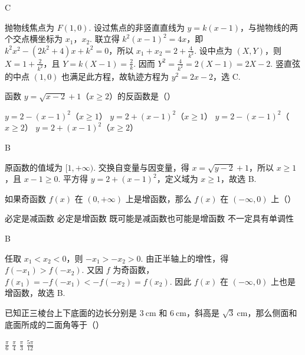 \documentclass[UTF8,a4paper,oneside,11pt]{ctexbook}
\begin{document}
\begin{answer}
C
\end{answer}

\begin{solution}
抛物线焦点为 \(F(1,0)\). 设过焦点的非竖直直线为 \(y=k(x-1)\)，与抛物线的两个交点横坐标为 \(x_1\)，\(x_2\). 联立得 \(k^2(x-1)^2=4x\)，即 \(k^2x^2-(2k^2+4)x+k^2=0\)，所以 \(x_1+x_2=2+\frac4{k^2}\). 设中点为 \((X,Y)\)，则 \(X=1+\frac2{k^2}\)，且 \(Y=k(X-1)=\frac2k\). 因而 \(Y^2=\frac4{k^2}=2(X-1)=2X-2\). 竖直弦的中点 \((1,0)\) 也满足此方程，故轨迹方程为 \(y^2=2x-2\)，选 C.
\end{solution}

\begin{problem}
函数 \(y = \sqrt{x - 2} + 1\)（\(x \geqslant 2\)）的反函数是（\quad）

\choices
    {\(y = 2 - (x - 1)^2\)（\(x \geqslant 1\)）}
    {\(y = 2 + (x - 1)^2\)（\(x \geqslant 1\)）}
    {\(y = 2 - (x - 1)^2\)（\(x \geqslant 2\)）}
    {\(y = 2 + (x - 1)^2\)（\(x \geqslant 2\)）}
\end{problem}

\begin{answer}
B
\end{answer}

\begin{solution}
原函数的值域为 \([1,+\infty)\). 交换自变量与因变量，得 \(x=\sqrt{y-2}+1\)，所以 \(x\geqslant1\)，且 \(x-1\geqslant0\). 平方得 \(y=2+(x-1)^2\)，定义域为 \(x\geqslant1\)，故选 B.
\end{solution}

\begin{problem}
如果奇函数 \(f(x)\) 在 \((0,+\infty)\) 上是增函数，那么 \(f(x)\) 在 \((-\infty,0)\) 上（\quad）

\choices
    {必定是减函数}
    {必定是增函数}
    {既可能是减函数也可能是增函数}
    {不一定具有单调性}
\end{problem}

\begin{answer}
B
\end{answer}

\begin{solution}
任取 \(x_1<x_2<0\)，则 \(-x_1>-x_2>0\). 由正半轴上的增性，得 \(f(-x_1)>f(-x_2)\). 又因 \(f\) 为奇函数，\(f(x_1)=-f(-x_1)<-f(-x_2)=f(x_2)\). 因此 \(f(x)\) 在 \((-\infty,0)\) 上也是增函数，故选 B.
\end{solution}

\begin{problem}
已知正三棱台上下底面的边长分别是 \(3\mathrm{~cm}\) 和 \(6\mathrm{~cm}\)，斜高是 \(\sqrt{3}\mathrm{~cm}\)，那么侧面和底面所成的二面角等于（\quad）

\choices
    {\(\frac{\pi}{6}\)}
    {\(\frac{\pi}{4}\)}
    {\(\frac{\pi}{3}\)}
    {\(\frac{5\pi}{12}\)}
\end{problem}
\end{document}
